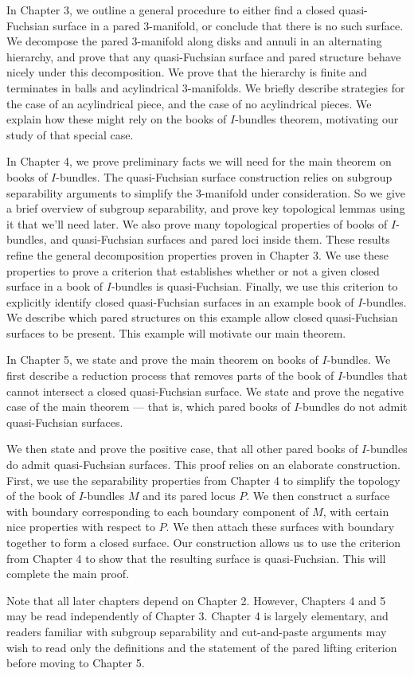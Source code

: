 In Chapter 3, we outline a general procedure to either find a closed
quasi-Fuchsian surface in a pared $3$-manifold, or conclude that there is no
such surface.  We decompose the pared $3$-manifold along disks and annuli in an
alternating hierarchy, and prove that any quasi-Fuchsian surface and pared
structure behave nicely under this decomposition. We prove that the hierarchy
is finite and terminates in balls and acylindrical $3$-manifolds. We briefly
describe strategies for the case of an acylindrical piece, and the case of no
acylindrical pieces. We explain how these might rely on the books of
$I$-bundles theorem, motivating our study of that special case.

In Chapter 4, we prove preliminary facts we will need for the main theorem on
books of $I$-bundles. The quasi-Fuchsian surface construction relies on
subgroup separability arguments to simplify the $3$-manifold under
consideration.  So we give a brief overview of subgroup separability, and prove
key topological lemmas using it that we'll need later. We also prove many
topological properties of books of $I$-bundles, and quasi-Fuchsian surfaces and
pared loci inside them.  These results refine the general decomposition
properties proven in Chapter 3.  We use these properties to prove a criterion
that establishes whether or not a given closed surface in a book of $I$-bundles
is quasi-Fuchsian.  Finally, we use this criterion to explicitly identify
closed quasi-Fuchsian surfaces in an example book of $I$-bundles. We describe
which pared structures on this example allow closed quasi-Fuchsian surfaces to
be present. This example will motivate our main theorem.

In Chapter 5, we state and prove the main theorem on books of $I$-bundles. We
first describe a reduction process that removes parts of the book of
$I$-bundles that cannot intersect a closed quasi-Fuchsian surface. We state and
prove the negative case of the main theorem --- that is, which pared books of
$I$-bundles do not admit quasi-Fuchsian surfaces.

We then state and prove the positive case, that all other pared books of
$I$-bundles do admit quasi-Fuchsian surfaces. This proof relies on an elaborate
construction. First, we use the separability properties from Chapter 4 to
simplify the topology of the book of $I$-bundles $M$ and its pared locus $P$.
We then construct a surface with boundary corresponding to each boundary
component of $M$, with certain nice properties with respect to $P$. We then
attach these surfaces with boundary together to form a closed surface. Our
construction allows us to use the criterion from Chapter 4 to show that the
resulting surface is quasi-Fuchsian. This will complete the main proof.

Note that all later chapters depend on Chapter 2. However, Chapters 4 and 5 may
be read independently of Chapter 3. Chapter 4 is largely elementary, and
readers familiar with subgroup separability and cut-and-paste arguments may
wish to read only the definitions and the statement of the pared lifting
criterion before moving to Chapter 5.
